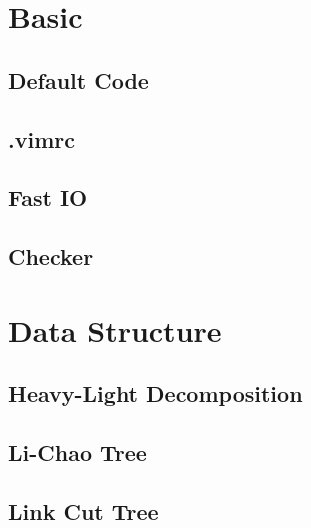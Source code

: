 \documentclass{article}
\begin{document}
\setlength\parindent{0pt}
\setlength\columnseprule{0.5pt}
\footnotesize


\pagestyle{fancy}
\fancyfoot{}
\fancyhead[R]{\thepage}

\twocolumn

\tableofcontents

\section{Basic}

\subsection{Default Code}


\subsection{.vimrc}


\subsection{Fast IO}


\subsection{Checker}


\section{Data Structure}

\subsection{Heavy-Light Decomposition}


\subsection{Li-Chao Tree}


\subsection{Link Cut Tree}

\end{document}
